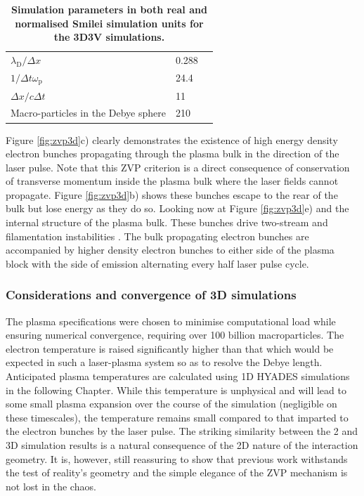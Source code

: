 \begin{table}[]
\begin{center}
\begin{tabular}{lll}
		$\lambda_\mathrm{D}/\Delta x$                               &0.288                                   &  \\
		$1/\Delta t \omega_\mathrm{p}$                             &24.4                                   &  \\
		$\Delta x/c\Delta t$                             &   11                               &  \\
		Macro-particles in the Debye sphere                    &210                                  &  \vspace{0.15cm}\\ \hline \hline 

	\end{tabular}
	\end{center}
	\caption{\label{tab:parameters} \textbf{Simulation parameters in both real and normalised Smilei simulation units for the 3D3V simulations.} }
\end{table}
Figure \ref{fig:zvp3d}c) clearly demonstrates the existence of high energy density electron bunches propagating through the plasma bulk in the direction of the laser pulse. Note that this ZVP criterion is a direct consequence of conservation of transverse momentum inside the plasma bulk where the laser fields cannot propagate. Figure \ref{fig:zvp3d}b) shows these bunches escape to the rear of the bulk but lose energy as they do so. Looking now at Figure \ref{fig:zvp3d}e) and the internal structure of the plasma bulk. These bunches drive two-stream and filamentation instabilities \cite{bretMultidimensionalElectronBeamplasma2010}. The bulk propagating electron bunches are accompanied by higher density electron bunches to either side of the plasma block with the side of emission alternating every half laser pulse cycle. 

\subsubsection{Considerations and convergence of 3D simulations}
The plasma specifications were chosen to minimise computational load while ensuring numerical convergence, requiring over 100 billion macroparticles. The electron temperature is raised significantly higher than that which would be expected in such a laser-plasma system so as to resolve the Debye length. Anticipated plasma temperatures are calculated using 1D HYADES simulations in the following Chapter. While this temperature is unphysical and will lead to some small plasma expansion over the course of the simulation (negligible on these timescales), the temperature remains small compared to that imparted to the electron bunches by the laser pulse. The striking similarity between the 2 and 3D simulation results is a natural consequence of the 2D nature of the interaction geometry. It is, however, still reassuring to show that previous work withstands the test of reality's geometry and the simple elegance of the ZVP mechanism is not lost in the chaos. 

